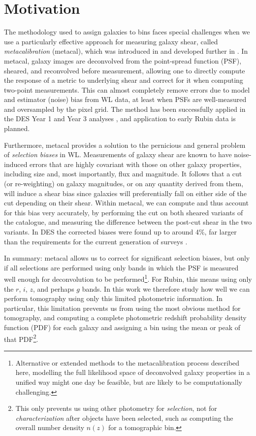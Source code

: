 \documentclass[twocolumn,twocolappendix]{aastex63}
\begin{document}
\section{Motivation}
\label{sec:motivation}

The methodology used to assign galaxies to bins faces special challenges when we use a particularly
effective approach for measuring galaxy shear, called \emph{metacalibration} (metacal),
which was introduced in \citet{sheldonhuff} and developed further in \citet{sheldon}.
In metacal, galaxy images are deconvolved from the point-spread function (PSF), sheared, and
reconvolved before measurement, allowing one to directly compute the response of a metric
to underlying shear and correct for it when computing two-point measurements.  This can
almost completely remove errors due to model and estimator (noise) bias from WL data, at least
when PSFs are well-measured and oversampled by the pixel grid.  The method has been successfully
applied in the DES Year 1 and Year 3 analyses \citep{des-y1-cat, des-y3-cat},
and application to early Rubin data is planned.

Furthermore, metacal provides a solution to the pernicious and general problem of
\emph{selection biases} in WL.  Measurements of galaxy shear are known to have noise-induced errors
that are
highly covariant with those on other galaxy properties, including size and, most importantly, flux and
magnitude.  It follows that a cut (or re-weighting) on galaxy magnitudes, or on any quantity derived
from  them, will induce a shear bias since galaxies will preferentially fall on either side of the cut
depending on their shear.  Within metacal, we can compute and thus account for this bias
very accurately, by performing the cut on both
sheared variants of the catalogue, and measuring the difference between the post-cut shear in the two
variants.  In DES the corrected biases were found up to around 4\%, far larger than
the requirements for the current generation of surveys \citep{des-y1-cat}.

In summary: metacal allows us to correct for significant selection biases, but only if all selections
are performed using only bands in which the PSF is measured well enough for deconvolution to be
performed\footnote{Alternative or extended methods to the metacalibration process described here, modelling the full likelihood space of deconvolved galaxy properties in a unified way might one day be feasible, but are likely to be computationally challenging.}.  For Rubin, this means using only the $r$, $i$, $z$, and perhaps $g$ bands.  In this work we
therefore study how well we can perform tomography using only this limited photometric information.  In
particular, this limitation prevents us from using the most obvious method for tomography,
and computing a complete photometric redshift probability density function (PDF) for each galaxy and assigning
a bin using the mean or peak of that PDF\footnote{This only prevents us using other photometry for \emph{selection}, not for \emph{characterization} after objects have been selected, such as computing the overall
number density $n(z)$ for a tomographic bin.}.
\end{document}
